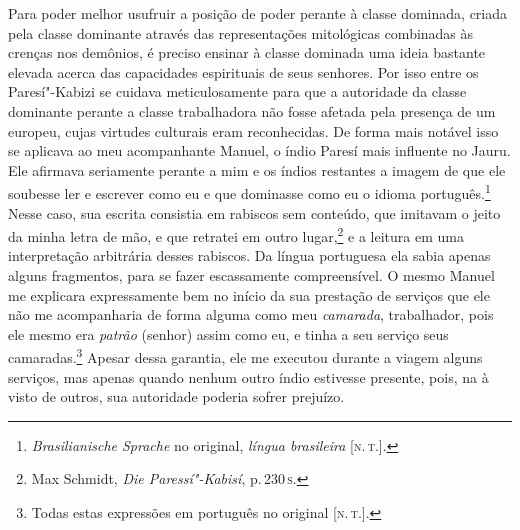 Para poder melhor usufruir a posição de poder perante à classe dominada,
criada pela classe dominante através das representações mitológicas
combinadas às crenças nos demônios, é preciso ensinar à classe dominada
uma ideia bastante elevada acerca das capacidades espirituais de seus
senhores. Por isso entre os Paresí"-Kabizi se cuidava meticulosamente
para que a autoridade da classe dominante perante a classe trabalhadora
não fosse afetada pela presença de um europeu, cujas virtudes culturais
eram reconhecidas. De forma mais notável isso se aplicava ao meu
acompanhante Manuel, o índio Paresí mais influente no Jauru. Ele
afirmava seriamente perante a mim e os índios restantes a imagem de que
ele soubesse ler e escrever como eu e que dominasse como eu o idioma
português.\footnote{\textit{Brasilianische Sprache} no original, \textit{língua
  brasileira} {[}\textsc{n.\,t.}{]}.} Nesse caso, sua escrita consistia em rabiscos sem conteúdo,
que imitavam o jeito da minha letra de mão, e que retratei em outro
lugar,\footnote{Max Schmidt, \textit{Die Paressí"-Kabisí}, p.\,230\,\textsc{s}.} e a leitura em uma interpretação arbitrária desses
rabiscos. Da língua portuguesa ela sabia apenas alguns fragmentos, para
se fazer escassamente compreensível. O mesmo Manuel me explicara
expressamente bem no início da sua prestação de serviços que ele não me
acompanharia de forma alguma como meu \textit{camarada}, trabalhador, pois ele
mesmo era \textit{patrão} (senhor) assim como eu, e tinha a seu serviço seus
camaradas.\footnote{Todas estas expressões em português no original {[}\textsc{n.\,t.}{]}.} Apesar dessa garantia, ele me executou durante a viagem
alguns serviços, mas apenas quando nenhum outro índio estivesse
presente, pois, na à visto de outros, sua autoridade poderia sofrer prejuízo.

